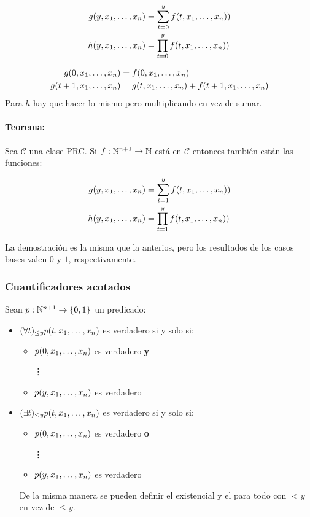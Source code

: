 \begin{align*}
	g(y,x_1,\dots, x_{n}) &= \sum_{t=0}^{y} f(t,x_1,\dots, x_{n})) \\
	h(y,x_1,\dots, x_{n}) &= \prod_{t=0}^{y} f(t,x_1,\dots, x_{n})) \\
\end{align*}

\begin{demo}
	\vspace*{-0.5cm}
\begin{align*}
	g(0,x_1,\dots, x_{n}) &= f(0, x_1,\dots, x_{n}) \\
	g(t+1,x_1,\dots, x_{n}) &= g(t, x_1,\dots, x_{n}) + f(t+1, x_1,\dots, x_{n})
\end{align*}
Para $h$ hay que hacer lo mismo pero multiplicando en vez de sumar.
\end{demo}

\paragraph{Teorema:} Sea $\mathcal{C}$ una clase PRC. Si $f:\mathbb{N}^{n+1}\to\mathbb{N}$ está en $\mathcal{C}$ entonces también están las funciones:

\begin{align*}
	g(y,x_1,\dots, x_{n}) &= \sum_{t=1}^{y} f(t,x_1,\dots, x_{n})) \\
	h(y,x_1,\dots, x_{n}) &= \prod_{t=1}^{y} f(t,x_1,\dots, x_{n})) \\
\end{align*}

La demostración es la misma que la anterios, pero los resultados de los casos bases valen $0$ y $1$, respectivamente.

\subsubsection{Cuantificadores acotados}
Sean $p:\mathbb{N}^{n+1}\to\{0,1\}$ un predicado:
\begin{itemize}
	\item[] $(\forall t)_{\leq y} p(t,x_1,\dots, x_{n})$ es verdadero si y solo si:
	\begin{itemize}
		\item $p(0, x_1,\dots, x_{n})$ es verdadero \textbf{y}
		
		\hspace*{1cm}\vdots
		
		\item $p(y, x_1,\dots, x_{n})$ es verdadero 
	\end{itemize}
\item[] $(\exists t)_{\leq y} p(t,x_1,\dots, x_{n})$ es verdadero si y solo si:
\begin{itemize}
	\item $p(0, x_1,\dots, x_{n})$ es verdadero \textbf{o}
	
	\hspace*{1cm}\vdots
	
	\item $p(y, x_1,\dots, x_{n})$ es verdadero 
\end{itemize}
De la misma manera se pueden definir el existencial y el para todo con $< y$ en vez de $\leq y$.
\end{itemize}

